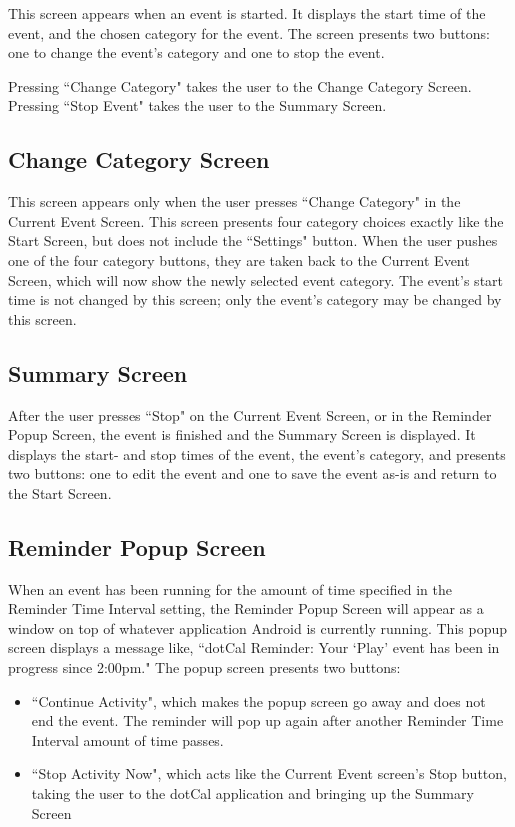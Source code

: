 \documentclass[11pt]{article}
\begin{document}
This screen appears when an event is started. It displays the start time of the event, and the chosen category for the event. The screen presents two buttons: one to change the event's category and one to stop the event.

Pressing ``Change Category" takes the user to the Change Category Screen. Pressing ``Stop Event" takes the user to the Summary Screen.

\subsection{Change Category Screen}

This screen appears only when the user presses ``Change Category" in the Current Event Screen. This screen presents four category choices exactly like the Start Screen, but does not include the ``Settings" button. When the user pushes one of the four category buttons, they are taken back to the Current Event Screen, which will now show the newly selected event category. The event's start time is not changed by this screen; only the event's category may be changed by this screen.

\subsection{Summary Screen}

After the user presses ``Stop" on the Current Event Screen, or in the Reminder Popup Screen, the event is finished and the Summary Screen is displayed. It displays the start- and stop times of the event, the event's category, and presents two buttons: one to edit the event and one to save the event as-is and return to the Start Screen.

\subsection{Reminder Popup Screen}

When an event has been running for the amount of time specified in the Reminder Time Interval setting, the Reminder Popup Screen will appear as a window on top of whatever application Android is currently running. This popup screen displays a message like, ``dotCal Reminder: Your `Play' event has been in progress since 2:00pm." The popup screen presents two buttons:
\begin{itemize}
	\item{``Continue Activity", which makes the popup screen go away and does not end the event. The reminder will pop up again after another Reminder Time Interval amount of time passes.}
	\item{``Stop Activity Now", which acts like the Current Event screen's Stop button, taking the user to the dotCal application and bringing up the Summary Screen}
\end{itemize}
\end{document}

